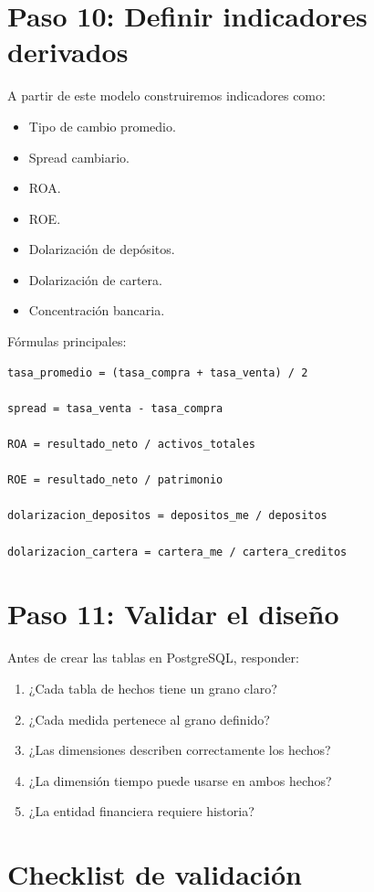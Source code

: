 \section{Paso 10: Definir indicadores derivados}

A partir de este modelo construiremos indicadores como:

\begin{itemize}
\item Tipo de cambio promedio.
\item Spread cambiario.
\item ROA.
\item ROE.
\item Dolarización de depósitos.
\item Dolarización de cartera.
\item Concentración bancaria.
\end{itemize}

Fórmulas principales:

\begin{verbatim}
tasa_promedio = (tasa_compra + tasa_venta) / 2

spread = tasa_venta - tasa_compra

ROA = resultado_neto / activos_totales

ROE = resultado_neto / patrimonio

dolarizacion_depositos = depositos_me / depositos

dolarizacion_cartera = cartera_me / cartera_creditos
\end{verbatim}

\section{Paso 11: Validar el diseño}

Antes de crear las tablas en PostgreSQL, responder:

\begin{enumerate}
\item ¿Cada tabla de hechos tiene un grano claro?
\item ¿Cada medida pertenece al grano definido?
\item ¿Las dimensiones describen correctamente los hechos?
\item ¿La dimensión tiempo puede usarse en ambos hechos?
\item ¿La entidad financiera requiere historia?
\end{enumerate}

\section{Checklist de validación}

